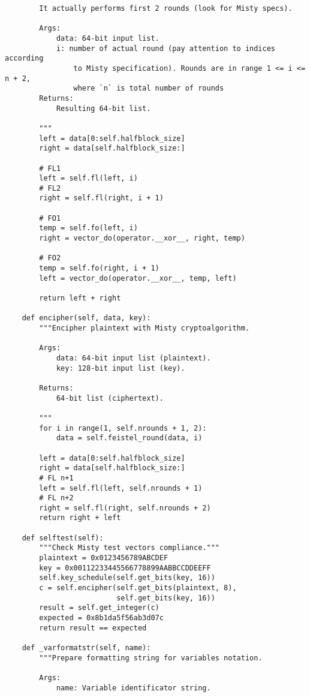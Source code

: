 \begin{lstlisting}
        It actually performs first 2 rounds (look for Misty specs).

        Args:
            data: 64-bit input list.
            i: number of actual round (pay attention to indices according
                to Misty specification). Rounds are in range 1 <= i <= n + 2,
                where `n` is total number of rounds
        Returns:
            Resulting 64-bit list.

        """
        left = data[0:self.halfblock_size]
        right = data[self.halfblock_size:]

        # FL1
        left = self.fl(left, i)
        # FL2
        right = self.fl(right, i + 1)

        # FO1
        temp = self.fo(left, i)
        right = vector_do(operator.__xor__, right, temp)

        # FO2
        temp = self.fo(right, i + 1)
        left = vector_do(operator.__xor__, temp, left)

        return left + right

    def encipher(self, data, key):
        """Encipher plaintext with Misty cryptoalgorithm.

        Args:
            data: 64-bit input list (plaintext).
            key: 128-bit input list (key).

        Returns:
            64-bit list (ciphertext).

        """
        for i in range(1, self.nrounds + 1, 2):
            data = self.feistel_round(data, i)

        left = data[0:self.halfblock_size]
        right = data[self.halfblock_size:]
        # FL n+1
        left = self.fl(left, self.nrounds + 1)
        # FL n+2
        right = self.fl(right, self.nrounds + 2)
        return right + left

    def selftest(self):
        """Check Misty test vectors compliance."""
        plaintext = 0x0123456789ABCDEF
        key = 0x00112233445566778899AABBCCDDEEFF
        self.key_schedule(self.get_bits(key, 16))
        c = self.encipher(self.get_bits(plaintext, 8),
                          self.get_bits(key, 16))
        result = self.get_integer(c)
        expected = 0x8b1da5f56ab3d07c
        return result == expected

    def _varformatstr(self, name):
        """Prepare formatting string for variables notation.

        Args:
            name: Variable identificator string.


\end{lstlisting}
